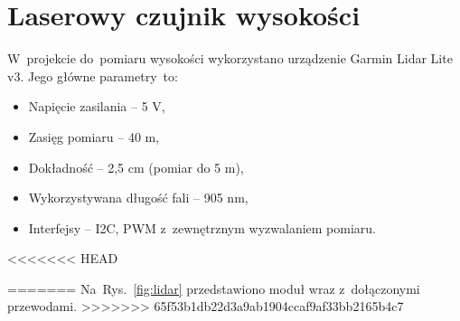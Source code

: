 \section{Laserowy czujnik wysokości}
\label{sec:laser}
W~projekcie do~pomiaru wysokości wykorzystano urządzenie Garmin Lidar Lite v3. 
Jego główne parametry~to:
\begin{itemize}
	\item Napięcie zasilania -- 5 V,
	\item Zasięg pomiaru -- 40 m,
	\item Dokładność -- 2,5 cm (pomiar do 5 m), 
	\item Wykorzystywana długość fali -- 905 nm,
	\item Interfejsy -- I2C, PWM z~zewnętrznym wyzwalaniem pomiaru.
\end{itemize}
<<<<<<< HEAD


=======
Na~Rys.~\ref{fig:lidar} przedstawiono moduł wraz z~dołączonymi przewodami.
>>>>>>> 65f53b1db22d3a9ab1904ccaf9af33bb2165b4c7
